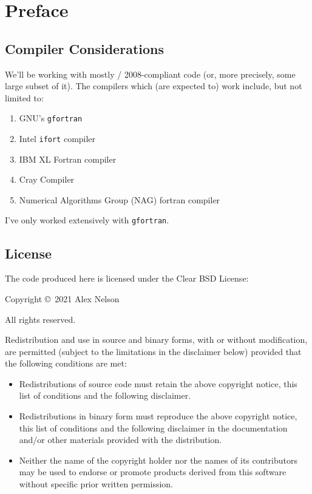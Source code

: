 \chapter{Preface}

\section*{Compiler Considerations}

We'll be working with mostly \FORTRAN/ 2008-compliant code (or, more
precisely, some large subset of it). The compilers which (are expected
to) work include, but not limited to:
\begin{enumerate}
\item GNU's {\tt gfortran}
\item Intel {\tt ifort} compiler
\item IBM XL Fortran compiler
\item Cray Compiler
\item Numerical Algorithms Group (NAG) fortran compiler
\end{enumerate}
I've only worked extensively with {\tt gfortran}.

\section*{License}

The code produced here is licensed under the Clear BSD License:

\bigskip

Copyright \copyright\ 2021 Alex Nelson

All rights reserved.

Redistribution and use in source and binary forms, with or without
modification, are permitted (subject to the limitations in the
disclaimer below) provided that the following conditions are met:

\begin{itemize}
\item Redistributions of source code must retain the above copyright
     notice, this list of conditions and the following disclaimer.
\item Redistributions in binary form must reproduce the above copyright
     notice, this list of conditions and the following disclaimer in the
     documentation and/or other materials provided with the
     distribution.
\item Neither the name of the copyright holder nor the names of its
     contributors may be used to endorse or promote products derived
     from this software without specific prior written permission.
\end{itemize}

